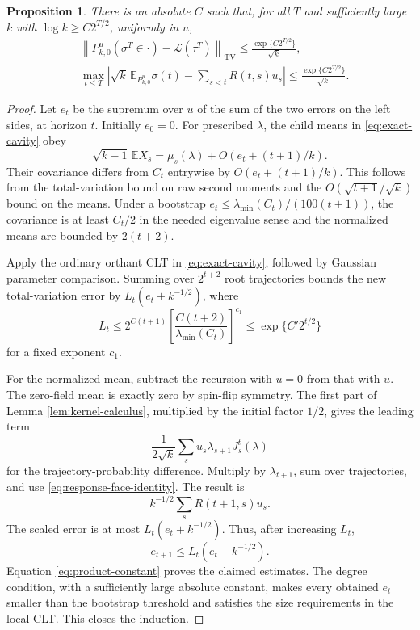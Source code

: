 \documentclass[11pt]{article}
\newtheorem{proposition}[theorem]{Proposition}
\theoremstyle{remark}\newtheorem{remark}[theorem]{Remark}
\newcommand{\E}{\mathbb E}
\newcommand{\TV}{\mathrm{TV}}
\newcommand{\norm}[1]{\left\lVert #1\right\rVert}
\begin{document}
\begin{proposition}\label{prop:unbiased-uniform}
There is an absolute $C$ such that, for all $T$ and sufficiently large
$k$ with $\log k\ge C2^{T/2}$, uniformly in $u$,
\begin{align}
 &\norm{P_{k,0}^{u}(\sigma^T\in\cdot)-\mathcal L(\tau^T)}_{\TV}
 \le \frac{\exp\{C2^{T/2}\}}{\sqrt k},\label{eq:unbiased-tv}\\
 &\max_{t\le T}\left|\sqrt k\,\E_{P_{k,0}^{u}}\sigma(t)
                 -\sum_{s<t}R(t,s)u_s\right|
 \le \frac{\exp\{C2^{T/2}\}}{\sqrt k}.
 \label{eq:unbiased-response}
\end{align}
\end{proposition}
\begin{proof}
Let $e_t$ be the supremum over $u$ of the sum of the two errors on the
left sides, at horizon $t$. Initially $e_0=0$.
For prescribed $\lambda$, the child means in \eqref{eq:exact-cavity}
obey
\[
 \sqrt{k-1}\,\E X_s=\mu_s(\lambda)+O(e_t+(t+1)/k).
\]
Their covariance differs from $C_t$ entrywise by
$O(e_t+(t+1)/k)$. This follows from the total-variation bound on raw
second moments and the $O(\sqrt{t+1}/\sqrt k)$ bound on the means.
Under a bootstrap $e_t\le\lambda_{\min}(C_t)/(100(t+1))$, the covariance
is at least $C_t/2$ in the needed eigenvalue sense and the normalized
means are bounded by $2(t+2)$.

Apply the ordinary orthant CLT in \eqref{eq:exact-cavity}, followed by
Gaussian parameter comparison. Summing over $2^{t+2}$ root trajectories
bounds the new total-variation error by $L_t(e_t+k^{-1/2})$, where
\[
 L_t\le 2^{C(t+1)}
      \left[\frac{C(t+2)}{\lambda_{\min}(C_t)}\right]^{c_1}
 \le\exp\{C'2^{t/2}\}
\]
for a fixed exponent $c_1$.

For the normalized mean, subtract the recursion with $u=0$ from that
with $u$. The zero-field mean is exactly zero by spin-flip symmetry.
The first part of Lemma \ref{lem:kernel-calculus}, multiplied by the
initial factor $1/2$, gives the leading term
\[
 \frac{1}{2\sqrt k}\sum_s u_s\lambda_{s+1}J_s^t(\lambda)
\]
for the trajectory-probability difference. Multiply by $\lambda_{t+1}$,
sum over trajectories, and use \eqref{eq:response-face-identity}. The result is
\[
 k^{-1/2}\sum_sR(t+1,s)u_s.
\]
The scaled error is at most $L_t(e_t+k^{-1/2})$.
Thus, after increasing $L_t$,
\[
 e_{t+1}\le L_t(e_t+k^{-1/2}).
\]
Equation \eqref{eq:product-constant} proves the claimed estimates.
The degree condition, with a sufficiently large absolute constant,
makes every obtained $e_t$ smaller than the bootstrap threshold and
satisfies the size requirements in the local CLT. This closes the
induction.
\end{proof}
\end{document}
